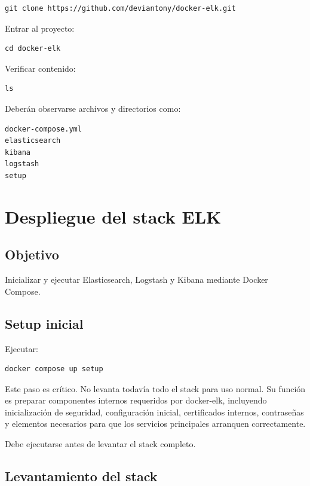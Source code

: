 \documentclass[
  coursetitle={Cómputo Nube y Tecnologías Emergentes},
  coursehours={96},
  coursedate={Verano 2026},
  doctype={Laboratorio},
  otherlangs={english,french},
  authorname={Lázaro},
  authorsurname={Bustio-Martínez},
  authortitle={PhD},
  role={Profesor Investigador},
  email={lbustio@inaoe.mx},
  phone={5559504000},
  ext={7459},
  institution={Instituto Nacional de Astrofísica, Óptica y Electrónica (INAOE)},
  department={Maestría en Ciencias en Tecnologías de Seguridad},
  address={Luis Enrique Erro 1, Sta. Ma. Tonantzintla, San Andrés Cholula, CP 72840, Puebla, México},
  margin={0.5in}
]{../../lbustio_lecture_notes}
\begin{document}
\begin{lstlisting}
git clone https://github.com/deviantony/docker-elk.git
\end{lstlisting}

Entrar al proyecto:

\begin{lstlisting}
cd docker-elk
\end{lstlisting}

Verificar contenido:

\begin{lstlisting}
ls
\end{lstlisting}

Deberán observarse archivos y directorios como:

\begin{verbatim}
docker-compose.yml
elasticsearch
kibana
logstash
setup
\end{verbatim}

\section{Despliegue del stack ELK}

\subsection{Objetivo}

Inicializar y ejecutar Elasticsearch, Logstash y Kibana mediante Docker Compose.

\subsection{Setup inicial}

Ejecutar:

\begin{lstlisting}
docker compose up setup
\end{lstlisting}

Este paso es crítico. No levanta todavía todo el stack para uso normal. Su función es preparar componentes internos requeridos por docker-elk, incluyendo inicialización de seguridad, configuración inicial, certificados internos, contraseñas y elementos necesarios para que los servicios principales arranquen correctamente.

Debe ejecutarse antes de levantar el stack completo.

\subsection{Levantamiento del stack}
\end{document}
